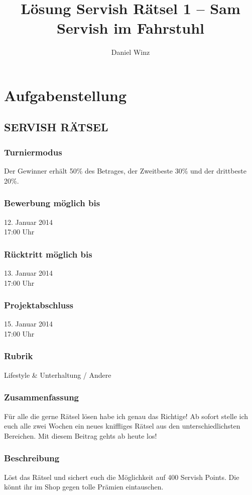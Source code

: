 \documentclass[10pt, fleqn]{article}
\title{Lösung Servish Rätsel 1 -- Sam Servish im Fahrstuhl}
\author{Daniel Winz}
\begin{document}
\vfill
\maketitle
\vfill
\tableofcontents
\vfill
\newpage

\section{Aufgabenstellung}
\subsection*{SERVISH RÄTSEL}
\subsubsection*{Turniermodus}
Der Gewinner erhält 50\% des Betrages, der Zweitbeste 30\% und der drittbeste 20\%. 

\subsubsection*{Bewerbung möglich bis}
12. Januar 2014 \\
17:00 Uhr

\subsubsection*{Rücktritt möglich bis}
13. Januar 2014 \\
17:00 Uhr

\subsubsection*{Projektabschluss}
15. Januar 2014 \\
17:00 Uhr

\subsubsection*{Rubrik}
Lifestyle \& Unterhaltung / Andere

\subsubsection*{Zusammenfassung}
Für alle die gerne Rätsel lösen habe ich genau das Richtige! Ab sofort stelle 
ich euch alle zwei Wochen ein neues kniffliges Rätsel aus den 
unterschiedlichsten Bereichen. Mit diesem Beitrag gehts ab heute los!

\subsubsection*{Beschreibung}
Löst das Rätsel und sichert euch die Möglichkeit auf 400 Servish Points. Die 
könnt ihr im Shop gegen tolle Prämien eintauschen.
\end{document}
